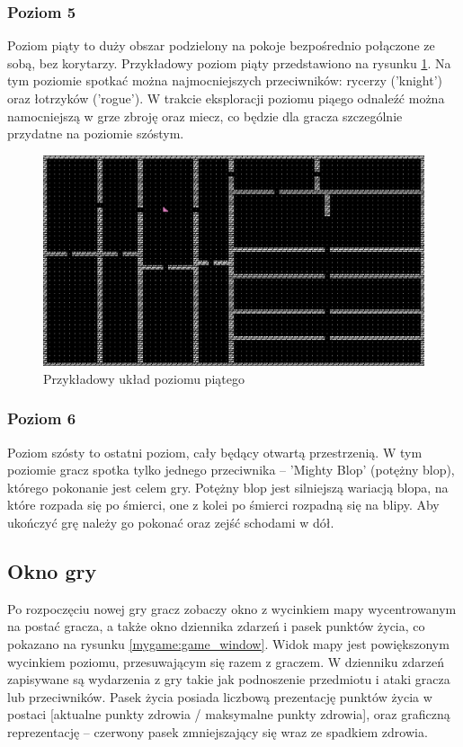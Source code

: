 \documentclass[12pt,twoside]{article}
\begin{document}
\subsubsection{Poziom 5}
Poziom piąty to duży obszar podzielony na pokoje bezpośrednio połączone ze sobą, bez korytarzy. Przykładowy poziom piąty przedstawiono na rysunku \ref{mygame:map5}. Na tym poziomie spotkać można najmocniejszych przeciwników: rycerzy ('knight') oraz łotrzyków ('rogue'). W trakcie eksploracji poziomu piąego odnaleźć można namocniejszą w grze zbroję oraz miecz, co będzie dla gracza szczególnie przydatne na poziomie szóstym.

\FloatBarrier
\begin{figure}[h]
	\centering
	\includegraphics[width=12cm]{images/mygame/map5.png}
	\caption{Przykładowy układ poziomu piątego}
	\label{mygame:map5}
\end{figure}
\FloatBarrier


\subsubsection{Poziom 6}
Poziom szósty to ostatni poziom, cały będący otwartą przestrzenią. W tym poziomie gracz spotka tylko jednego przeciwnika -- 'Mighty Blop' (potężny blop), którego pokonanie jest celem gry. Potężny blop jest silniejszą wariacją blopa, na które rozpada się po śmierci, one z kolei po śmierci rozpadną się na blipy. Aby ukończyć grę należy go pokonać oraz zejść schodami w dół.


\subsection{Okno gry}
Po rozpoczęciu nowej gry gracz zobaczy okno z wycinkiem mapy wycentrowanym na postać gracza, a także okno dziennika zdarzeń i pasek punktów życia, co pokazano na rysunku \ref{mygame:game_window}. Widok mapy jest powiększonym wycinkiem poziomu, przesuwającym się razem z graczem. W dzienniku zdarzeń zapisywane są wydarzenia z gry takie jak podnoszenie przedmiotu i ataki gracza lub przeciwników. Pasek życia posiada liczbową prezentację punktów życia w postaci [aktualne punkty zdrowia / maksymalne punkty zdrowia], oraz graficzną reprezentację -- czerwony pasek zmniejszający się wraz ze spadkiem zdrowia.
\end{document}
